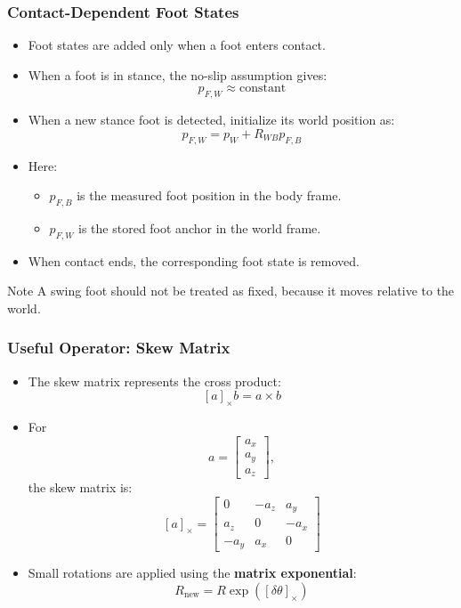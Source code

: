 \documentclass[aspectratio=169]{beamer}
\begin{document}
\begin{frame}
	\frametitle{Contact-Dependent Foot States}
	
	\begin{itemize}
		\item Foot states are added only when a foot enters contact.
		\item When a foot is in stance, the no-slip assumption gives:
		\[
		p_{F,W} \approx \text{constant}
		\]
		
		\item When a new stance foot is detected, initialize its world position as:
		\[
		p_{F,W} = p_W + R_{WB}p_{F,B}
		\]
		
		\item Here:
		\begin{itemize}
			\item $p_{F,B}$ is the measured foot position in the body frame.
			\item $p_{F,W}$ is the stored foot anchor in the world frame.
		\end{itemize}
		
		\item When contact ends, the corresponding foot state is removed.
	\end{itemize}
	
	\begin{block}{Note}
		A swing foot should not be treated as fixed, because it moves relative to the world.
	\end{block}
	
\end{frame}


\begin{frame}
	\frametitle{Useful Operator: Skew Matrix}
	
	\begin{itemize}
		\item The skew matrix represents the cross product:
		\[
		[a]_\times b = a \times b
		\]
		
		\item For
		\[
		a =
		\begin{bmatrix}
			a_x \\ a_y \\ a_z
		\end{bmatrix},
		\]
		the skew matrix is:
		\[
		[a]_\times =
		\begin{bmatrix}
			0 & -a_z & a_y \\
			a_z & 0 & -a_x \\
			-a_y & a_x & 0
		\end{bmatrix}
		\]
		
		\item Small rotations are applied using the \textbf{matrix exponential}:
		\[
		R_{\text{new}} = R\exp([\delta\theta]_\times)
		\]
	\end{itemize}
	
\end{frame}
\end{document}
